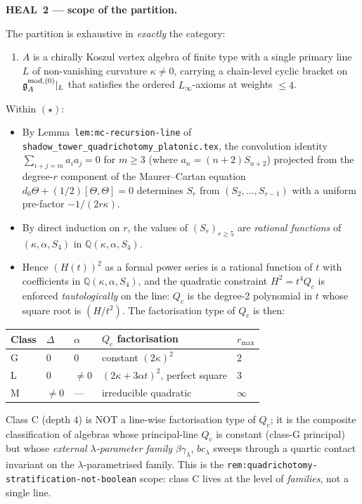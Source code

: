 \textbf{HEAL~2 --- scope of the partition.}

The partition is exhaustive in \emph{exactly} the category:
\begin{enumerate}
\item[($\star$)] $A$ is a chirally Koszul vertex algebra of finite type
  with a single primary line $L$ of non-vanishing curvature $\kappa \ne 0$,
  carrying a chain-level cyclic bracket on
  $\mathfrak g^{\rm mod,(0)}_A|_L$ that satisfies the ordered $L_\infty$-axioms
  at weights $\le 4$.
\end{enumerate}

Within $(\star)$:

\begin{itemize}
\item By Lemma~\texttt{lem:mc-recursion-line} of
  \texttt{shadow\_tower\_quadrichotomy\_platonic.tex}, the convolution
  identity $\sum_{i+j=m} a_i a_j = 0$ for $m \ge 3$ (where $a_n = (n+2)S_{n+2}$)
  projected from the degree-$r$ component of the Maurer--Cartan equation
  $d_0 \Theta + (1/2)[\Theta, \Theta] = 0$ determines $S_r$ from
  $(S_2, \ldots, S_{r-1})$ with a uniform pre-factor $-1/(2r\kappa)$.
\item By direct induction on $r$, the values of $(S_r)_{r \ge 5}$ are
  \emph{rational functions} of $(\kappa, \alpha, S_4)$ in
  $\mathbb Q(\kappa, \alpha, S_4)$.
\item Hence $(H(t))^2$ as a formal power series is a rational function of
  $t$ with coefficients in $\mathbb Q(\kappa, \alpha, S_4)$, and the
  quadratic constraint $H^2 = t^4 Q_c$ is enforced \emph{tautologically} on
  the line: $Q_c$ is the degree-2 polynomial in $t$ whose square root is
  $(H/t^2)$. The factorisation type of $Q_c$ is then:
\end{itemize}

\begin{center}
\begin{tabular}{l|l|l|l|l}
Class & $\Delta$ & $\alpha$ & $Q_c$ factorisation & $r_{\max}$ \\\hline
G & $0$ & $0$ & constant $(2\kappa)^2$ & $2$ \\
L & $0$ & $\ne 0$ & $(2\kappa + 3\alpha t)^2$, perfect square & $3$ \\
M & $\ne 0$ & --- & irreducible quadratic & $\infty$
\end{tabular}
\end{center}

Class C (depth $4$) is NOT a line-wise factorisation type of $Q_c$; it is
the composite classification of algebras whose principal-line $Q_c$ is
constant (class-G principal) but whose \emph{external $\lambda$-parameter
family} $\beta\gamma_\lambda$, $bc_\lambda$ sweeps through a quartic
contact invariant on the $\lambda$-parametrised family. This is the
\texttt{rem:quadrichotomy-stratification-not-boolean} scope: class C lives
at the level of \emph{families}, not a single line.

